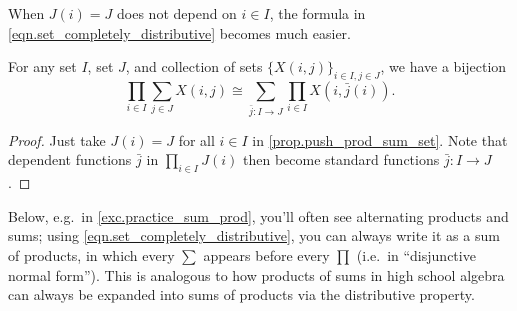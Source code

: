 \documentclass[Book-Poly]{subfiles}
\begin{document}
When $J(i)=J$ does not depend on $i\in I$, the formula in \eqref{eqn.set_completely_distributive} becomes much easier.

\begin{corollary} \label{prop.push_prod_sum_set_indep}
For any set $I$, set $J$, and collection of sets $\{X(i, j)\}_{i \in I, j \in J}$, we have a bijection
\begin{equation}
    \prod_{i\in I}\sum_{j\in J}X(i,j)\cong\sum_{\bar{j}\colon I\to J}\prod_{i\in I}X(i,\bar{j}(i)).
\end{equation}
\end{corollary}
\begin{proof}
Just take $J(i) = J$ for all $i \in I$ in \cref{prop.push_prod_sum_set}.
Note that dependent functions $\bar{j}$ in $\prod_{i \in I} J(i)$ then become standard functions $\bar{j} \colon I \to J$.
\end{proof}

Below, e.g.\ in \cref{exc.practice_sum_prod}, you'll often see alternating products and sums; using \eqref{eqn.set_completely_distributive}, you can always write it as a sum of products, in which every $\sum$ appears before every $\prod$ (i.e.\ in ``disjunctive normal form'').
This is analogous to how products of sums in high school algebra can always be expanded into sums of products via the distributive property.

\end{document}
